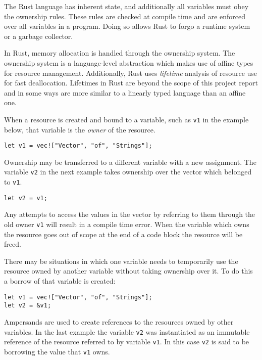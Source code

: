 \documentclass[onehalf,11pt]{beavtex}
\begin{document}
The Rust language has inherent state, and additionally all variables must obey
the ownership rules.
These rules are checked at compile time and are enforced over all variables in
a program.
Doing so allows Rust to forgo a runtime system or a garbage collector.

In Rust, memory allocation is handled through the ownership system.
The ownership system is a language-level abstraction which makes use of
affine types for resource management.
Additionally, Rust uses \textit{lifetime} analysis of resource use for fast
deallocation. Lifetimes in Rust are beyond the scope of this project report and
in some ways are more similar to a linearly typed language than an affine one.

When a resource is created and bound to a variable, such as \texttt{v1} in the
example below, that variable is the \textit{owner} of the resource.

\begin{verbatim}
let v1 = vec!["Vector", "of", "Strings"];
\end{verbatim}

Ownership may be transferred to a different variable with a new assignment.
The variable \texttt{v2} in the next example takes ownership over the
vector which belonged to \texttt{v1}. 

\begin{verbatim}
let v2 = v1;
\end{verbatim}

Any attempts to access the values in the vector by referring to them through
the old owner \texttt{v1} will result in a compile time error.
When the variable which owns the resource goes out of scope at the end of a
code block the resource will be freed.

There may be situations in which one variable needs to temporarily
use the resource owned by another variable without taking ownership over it.
To do this a borrow of that variable is created:

\begin{verbatim}
let v1 = vec!["Vector", "of", "Strings"];
let v2 = &v1;
\end{verbatim}

Ampersands are used to create references to the resources owned by other
variables.
In the last example the variable \texttt{v2} was instantiated as an immutable
reference of the resource referred to by variable \texttt{v1}.
In this case \texttt{v2} is said to be borrowing the value
that \texttt{v1} owns.
\end{document}

